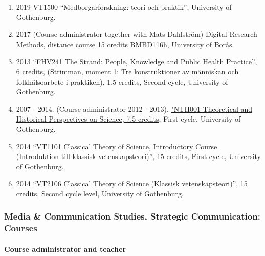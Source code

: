 \documentclass[
]{article}
\providecommand{\tightlist}{%
  \setlength{\itemsep}{0pt}\setlength{\parskip}{0pt}}
\begin{document}
\begin{enumerate}
\def\labelenumi{\arabic{enumi}.}
\tightlist
\item
  2019 VT1500 ``Medborgarforskning: teori och praktik'', University of
  Gothenburg.
\item
  2017 (Course administrator together with Mats Dahlström) Digital
  Research Methods, distance course 15 credits BMBD116h, University of
  Borås.
\item
  2013
  \href{http://files.christopherkullenberg.se/kursplaner/FHV241Strimman.pdf}{``FHV241
  The Strand: People, Knowledge and Public Health Practice''}, 6
  credits, (Strimman, moment 1: Tre konstruktioner av människan och
  folkhälsoarbete i praktiken), 1.5 credits, Second cycle, University of
  Gothenburg.
\item
  2007 - 2014. (Course administrator 2012 - 2013).
  \href{http://files.christopherkullenberg.se/kursplaner/NTH001_Teoretiska_och_historiska_perspektiv_pa\%cc\%8a_naturvetenskap_10512.pdf}{"NTH001
  Theoretical and Historical Perspectives on Science, 7.5 credits},
  First cycle, University of Gothenburg.
\item
  2014
  \href{http://files.christopherkullenberg.se/kursplaner/VT1101_Introduktion_i_klassisk_vetenskapsteori__grundkurs_13185.pdf}{``VT1101
  Classical Theory of Science, Introductory Course (Introduktion till
  klassisk vetenskapsteori)''}, 15 credits, First cycle, University of
  Gothenburg.
\item
  2014
  \href{http://files.christopherkullenberg.se/kursplaner/VT2106_Klassisk_vetenskapsteori_13187.pdf}{``VT2106
  Classical Theory of Science (Klassisk vetenskapsteori)''}, 15 credits,
  Second cycle level, University of Gothenburg.
\end{enumerate}

\hypertarget{media-communication-studies-strategic-communication-courses}{%
\subsubsection{Media \& Communication Studies, Strategic Communication:
Courses}\label{media-communication-studies-strategic-communication-courses}}

\hypertarget{course-administrator-and-teacher-1}{%
\paragraph{Course administrator and
teacher}\label{course-administrator-and-teacher-1}}
\end{document}
